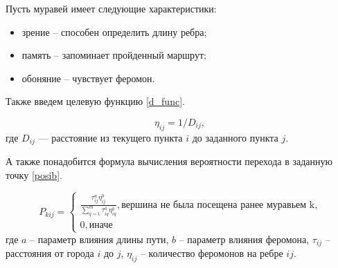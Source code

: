 Пусть муравей имеет следующие характеристики:
\begin{itemize}
	\item зрение -- способен определить длину ребра;
	\item память -- запоминает пройденный маршрут;
	\item обоняние -- чувствует феромон.
\end{itemize}


Также введем целевую функцию \eqref{d_func}.

\begin{equation}
	\label{d_func}
	\eta_{ij} = 1 / D_{ij},
\end{equation}
где $D_{ij}$ — расстояние из текущего пункта $i$ до заданного пункта $j$.


А также понадобится формула вычисления вероятности перехода в заданную точку \eqref{posib}.

\begin{equation}
	\label{posib}
	P_{kij} = \begin{cases}
		\frac{\tau_{ij}^a\eta_{ij}^b}{\sum_{q=1}^m \tau^a_{iq}\eta^b_{iq}}, \textrm{вершина не была посещена ранее муравьем k,} \\
		0, \textrm{иначе}
	\end{cases}
\end{equation}
где $a$ -- параметр влияния длины пути, $b$ -- параметр влияния феромона, $\tau_{ij}$ -- расстояния от города $i$ до $j$, $\eta_{ij}$ -- количество феромонов на ребре $ij$.

